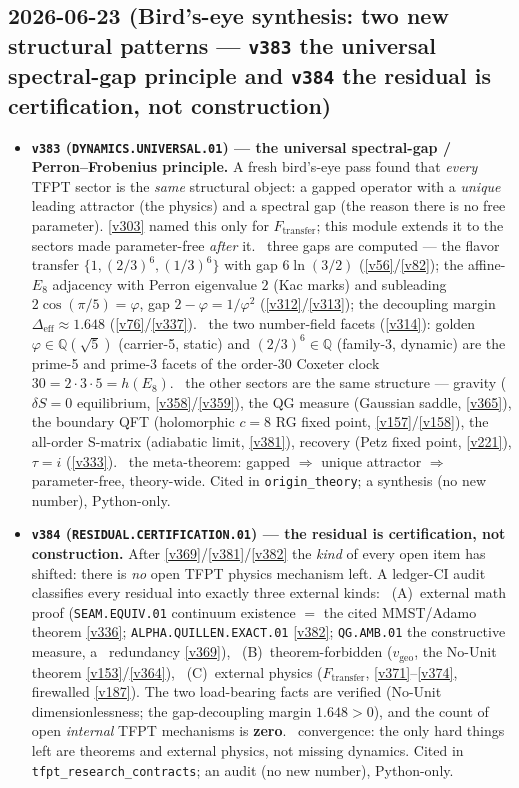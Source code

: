 \subsection*{2026-06-23 (Bird's-eye synthesis: two new structural patterns --- \texttt{v383} the universal spectral-gap principle and \texttt{v384} the residual is certification, not construction)}
\begin{itemize}
\item \textbf{\texttt{v383} (\texttt{DYNAMICS.UNIVERSAL.01}) --- the universal spectral-gap / Perron--Frobenius principle.}
A fresh bird's-eye pass found that \emph{every} TFPT sector is the \emph{same} structural object: a gapped operator with
a \emph{unique} leading attractor (the physics) and a spectral gap (the reason there is no free parameter).
\vref{v303} named this only for $F_{\mathrm{transfer}}$; this module extends it to the sectors made parameter-free
\emph{after} it. \mE\ three gaps are computed --- the flavor transfer $\{1,(2/3)^6,(1/3)^6\}$ with gap $6\ln(3/2)$
(\vref{v56}/\vref{v82}); the affine-$E_8$ adjacency with Perron eigenvalue $2$ (Kac marks) and subleading
$2\cos(\pi/5)=\varphi$, gap $2-\varphi=1/\varphi^2$ (\vref{v312}/\vref{v313}); the decoupling margin
$\Delta_{\mathrm{eff}}\approx1.648$ (\vref{v76}/\vref{v337}). \mE\ the two number-field facets (\vref{v314}): golden
$\varphi\in\mathbb Q(\sqrt5)$ (carrier-5, static) and $(2/3)^6\in\mathbb Q$ (family-3, dynamic) are the prime-5 and
prime-3 facets of the order-30 Coxeter clock $30=2{\cdot}3{\cdot}5=h(E_8)$. \mC\ the other sectors are the same
structure --- gravity ($\delta S{=}0$ equilibrium, \vref{v358}/\vref{v359}), the QG measure (Gaussian saddle,
\vref{v365}), the boundary QFT (holomorphic $c{=}8$ RG fixed point, \vref{v157}/\vref{v158}), the all-order S-matrix
(adiabatic limit, \vref{v381}), recovery (Petz fixed point, \vref{v221}), $\tau{=}i$ (\vref{v333}). \mC\ the
meta-theorem: gapped $\Rightarrow$ unique attractor $\Rightarrow$ parameter-free, theory-wide. Cited in
\texttt{origin\_theory}; a synthesis (no new number), Python-only.
\item \textbf{\texttt{v384} (\texttt{RESIDUAL.CERTIFICATION.01}) --- the residual is certification, not construction.}
After \vref{v369}/\vref{v381}/\vref{v382} the \emph{kind} of every open item has shifted: there is \emph{no} open TFPT
physics mechanism left. A ledger-CI audit classifies every residual into exactly three external kinds: \mE\ (A)~external
math proof (\texttt{SEAM.EQUIV.01} continuum existence $=$ the cited MMST/Adamo theorem \vref{v336};
\texttt{ALPHA.QUILLEN.EXACT.01} \vref{v382}; \texttt{QG.AMB.01} the constructive measure, a \mC\ redundancy \vref{v369}),
\mE\ (B)~theorem-forbidden ($v_{\mathrm{geo}}$, the No-Unit theorem \vref{v153}/\vref{v364}), \mE\ (C)~external physics
($F_{\mathrm{transfer}}$, \vref{v371}--\vref{v374}, firewalled \vref{v187}). The two load-bearing facts are verified
(No-Unit dimensionlessness; the gap-decoupling margin $1.648>0$), and the count of open \emph{internal} TFPT mechanisms
is \textbf{zero}. \mC\ convergence: the only hard things left are theorems and external physics, not missing dynamics.
Cited in \texttt{tfpt\_research\_contracts}; an audit (no new number), Python-only.
\end{itemize}

